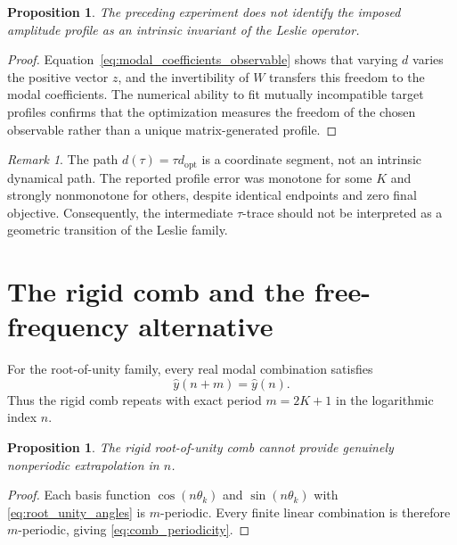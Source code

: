 \documentclass[11pt]{amsart}
\numberwithin{equation}{section}
\theoremstyle{plain}
\newtheorem{proposition}[theorem]{Proposition}
\theoremstyle{definition}
\theoremstyle{remark}
\newtheorem{remark}[theorem]{Remark}
\begin{document}
\begin{proposition}
\label{prop:profile_not_intrinsic}
The preceding experiment does not identify the imposed amplitude profile as an intrinsic invariant of the Leslie operator.
\end{proposition}

\begin{proof}
Equation~\eqref{eq:modal_coefficients_observable} shows that varying $d$ varies the positive vector $z$, and the invertibility of $W$ transfers this freedom to the modal coefficients.  The numerical ability to fit mutually incompatible target profiles confirms that the optimization measures the freedom of the chosen observable rather than a unique matrix-generated profile.
\end{proof}

\begin{remark}
\label{rem:tau_path_failure}
The path $d(\tau)=\tau d_{\mathrm{opt}}$ is a coordinate segment, not an intrinsic dynamical path.  The reported profile error was monotone for some $K$ and strongly nonmonotone for others, despite identical endpoints and zero final objective.  Consequently, the intermediate $\tau$-trace should not be interpreted as a geometric transition of the Leslie family.
\end{remark}

\section{The rigid comb and the free-frequency alternative}
\label{sec:comb_free_frequencies}

For the root-of-unity family, every real modal combination satisfies
\begin{equation}
\widehat y(n+m)=\widehat y(n).
\label{eq:comb_periodicity}
\end{equation}
Thus the rigid comb repeats with exact period $m=2K+1$ in the logarithmic index $n$.

\begin{proposition}
\label{prop:comb_no_extrapolation}
The rigid root-of-unity comb cannot provide genuinely nonperiodic extrapolation in $n$.
\end{proposition}

\begin{proof}
Each basis function $\cos(n\theta_k)$ and $\sin(n\theta_k)$ with \eqref{eq:root_unity_angles} is $m$-periodic.  Every finite linear combination is therefore $m$-periodic, giving \eqref{eq:comb_periodicity}.
\end{proof}
\end{document}
